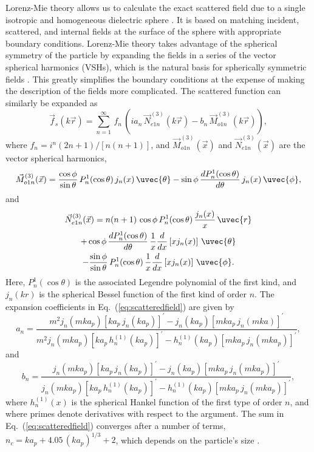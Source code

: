 Lorenz-Mie theory allows us to calculate the exact scattered field due to a single isotropic and homogeneous dielectric sphere \cite{bohren83,barber90}.
It is based on matching incident, scattered, and internal fields at the surface of the sphere with appropriate boundary conditions. Lorenz-Mie theory takes advantage of the spherical symmetry of the particle by expanding the fields in a series of the vector spherical harmonics (VSHs),
which is the natural basis for spherically symmetric fields \cite{bohren83,gouesbet11,mishchenko14}. This greatly simplifies the boundary conditions at the expense of making the description of the fields more complicated.
The scattered function can similarly be expanded as \cite{gouesbet10}
\begin{equation}
\label{eq:scatteredfield}
  \vec{f}_s(k \vec{r}) = \sum_{n=1}^\infty \, f_n \, \left(
    i a_n \, \vec{N}^{(3)}_{e1n}(k \vec{r}) - b_n \,
    \vec{M}^{(3)}_{o1n}(k \vec{r})
    \right),
\end{equation}
where $f_n=i^n (2n+1)/[n(n+1)]$, and $\vec{M}^{(3)}_{o1n}(\vec{x})$ and 
$\vec{N}^{(3)}_{e1n}(\vec{x})$ are the vector spherical harmonics,
\begin{equation}
    \vec{M}^{(3)}_{o1n}(\vec{x}) = \frac{\cos\phi}{\sin\theta} \,
  P^1_n(\cos\theta) \, j_n(x) \, \uvec{\theta}
  - \sin\phi \, \frac{dP^1_n(\cos\theta)}{d\theta} \, j_n(x) \, \uvec{\phi},
\end{equation}
and
\begin{multline}
  \vec{N}^{(3)}_{e1n}(\vec{x}) = n(n+1) \, \cos\phi
  \,P^1_n(\cos\theta) \, \frac{j_n(x)}{x} \, \uvec{r} \\
  + \cos\phi \, \frac{dP^1_n(\cos\theta)}{d\theta} \,
  \frac{1}{x} \frac{d}{dx}\left[x j_n(x)\right] \, \uvec{\theta} \\
  - \frac{\sin\phi}{\sin\theta} \, P^1_n(\cos\theta) \,
  \frac{1}{x}\frac{d}{dx}\left[x j_n(x)\right] \, \uvec{\phi}.
\end{multline}
Here, $P^1_n(\cos\theta)$ is the associated Legendre polynomial of the
first kind, and $j_n(kr)$ is the spherical Bessel function of the
first kind of order $n$.
The expansion coefficients in Eq.~(\ref{eq:scatteredfield}) are given
by \cite{bohren83}
\begin{equation}
  a_n = \frac{m^2 j_n(mka_p) \left[ka_p \, j_n(ka_p)\right]^\prime -
    j_n(ka_p) \left[mka_p \, j_n(mka)\right]^\prime}{
    m^2 j_n(mka_p) \left[ka_p \, h^{(1)}_n(ka_p)\right]^\prime -
    h^{(1)}_n(ka_p) \left[mka_p \, j_n(mka_p)\right]^\prime},
\end{equation}
and
\begin{equation}
\label{eq:bn}
  b_n = \frac{j_n(mka_p) \left[ka_p \, j_n(ka_p)\right]^\prime -
    j_n(ka_p) \left[mka_p \, j_n(m ka_p)\right]^\prime}{
    j_n(mka_p) \left[ka_p \, h^{(1)}_n(ka_p)\right]^\prime -
    h^{(1)}_n(ka_p) \left[mka_p \, j_n(mka_p)\right]^\prime},
\end{equation}
where $h^{(1)}_n(x)$ is the spherical Hankel function of
the first type of order $n$, and where primes denote derivatives
with respect to the argument. The sum in Eq.~(\ref{eq:scatteredfield}) converges after a number of terms, 
$n_c = ka_p + 4.05 \, (ka_p)^{1/3} + 2$, which depends on the particle's size \cite{barber90,mishchenko02}.


